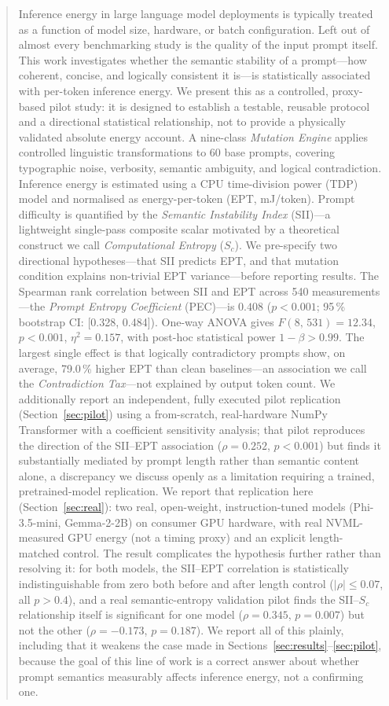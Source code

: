 \documentclass[conference]{IEEEtran}
\begin{document}
\begin{abstract}
Inference energy in large language model deployments is typically
treated as a function of model size, hardware, or batch configuration.
Left out of almost every benchmarking study is the quality of the
input prompt itself. This work investigates whether the semantic
stability of a prompt---how coherent, concise, and logically consistent
it is---is statistically associated with per-token inference energy.
We present this as a controlled, proxy-based pilot study: it is
designed to establish a testable, reusable protocol and a directional
statistical relationship, not to provide a physically validated
absolute energy account. A nine-class \emph{Mutation Engine} applies
controlled linguistic transformations to 60 base prompts, covering
typographic noise, verbosity, semantic ambiguity, and logical
contradiction. Inference energy is estimated using a CPU
time-division power (TDP) model and normalised as energy-per-token
(EPT, mJ/token). Prompt difficulty is quantified by the \emph{Semantic
Instability Index} (SII)---a lightweight single-pass composite scalar
motivated by a theoretical construct we call \emph{Computational
Entropy} ($S_c$). We pre-specify two directional hypotheses---that SII
predicts EPT, and that mutation condition explains non-trivial EPT
variance---before reporting results. The Spearman rank correlation
between SII and EPT across 540 measurements---the \emph{Prompt
Entropy Coefficient} (PEC)---is $0.408$ ($p < 0.001$; 95\,\% bootstrap
CI: [0.328, 0.484]). One-way ANOVA gives $F(8,\,531)=12.34$,
$p < 0.001$, $\eta^2 = 0.157$, with post-hoc statistical power
$1-\beta > 0.99$. The largest single effect is that logically
contradictory prompts show, on average, 79.0\,\% higher EPT than
clean baselines---an association we call the \emph{Contradiction
Tax}---not explained by output token count. We additionally report an
independent, fully executed pilot replication (Section~\ref{sec:pilot})
using a from-scratch, real-hardware NumPy Transformer with a
coefficient sensitivity analysis; that pilot reproduces the direction
of the SII--EPT association ($\rho = 0.252$, $p < 0.001$) but finds it
substantially mediated by prompt length rather than semantic content
alone, a discrepancy we discuss openly as a limitation requiring a
trained, pretrained-model replication. We report that replication
here (Section~\ref{sec:real}): two real, open-weight,
instruction-tuned models (Phi-3.5-mini, Gemma-2-2B) on consumer GPU
hardware, with real NVML-measured GPU energy (not a timing proxy) and
an explicit length-matched control. The result complicates the
hypothesis further rather than resolving it: for both models, the
SII--EPT correlation is statistically indistinguishable from zero
both before and after length control ($|\rho| \le 0.07$, all
$p > 0.4$), and a real semantic-entropy validation pilot finds the
SII--$S_c$ relationship itself is significant for one model
($\rho = 0.345$, $p = 0.007$) but not the other ($\rho = -0.173$,
$p = 0.187$). We report all of this plainly, including that it
weakens the case made in Sections~\ref{sec:results}--\ref{sec:pilot},
because the goal of this line of work is a correct answer about
whether prompt semantics measurably affects inference energy, not a
confirming one.
\end{abstract}
\end{document}
